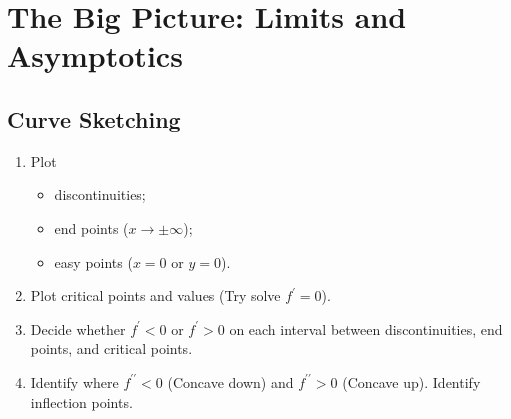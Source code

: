 \section{The Big Picture: Limits and Asymptotics}
\subsection{Curve Sketching}
\begin{enumerate}
\item Plot
  \begin{itemize}
  \item discontinuities;
  \item end points ($x\to\pm\infty$);
  \item easy points ($x=0$ or $y=0$).
  \end{itemize}
\item Plot critical points and values (Try solve $f^\prime=0$).
\item Decide whether $f^\prime<0$ or $f^\prime>0$ on each interval between discontinuities, end points, and critical points.
\item Identify where $f^{\prime\prime}<0$ (Concave down) and $f^{\prime\prime}>0$ (Concave up). Identify inflection points.
\end{enumerate}

